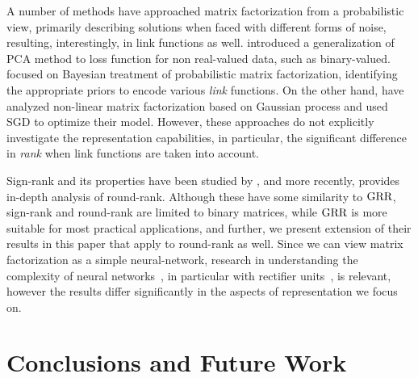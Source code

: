\documentclass{article}
\begin{document}
A number of methods have approached matrix factorization from a probabilistic view, primarily describing solutions when faced with different forms of noise, resulting, interestingly, in link functions as well.
\citet{collins01:a-generalization} introduced a generalization of PCA method to loss function for non real-valued data,
such as binary-valued.
\citet{salakhutdinov08:bayesian} focused on Bayesian treatment of probabilistic matrix factorization, identifying the appropriate priors to encode various \emph{link} functions. %
On the other hand, \citet{lawrence09:non-linear} have analyzed non-linear matrix factorization based on Gaussian process and used SGD to optimize their model. 
However, these approaches do not explicitly investigate the representation capabilities, in particular, the significant difference in \emph{rank} when link functions are taken into account.

Sign-rank and its properties have been studied by \citet{nickel14:reducing,bouchard15:on-approximate,davenport14:1-bit}, and more recently, \citet{neumann2015some} provides in-depth analysis of round-rank. 
Although these have some similarity to $\text{GRR}$, sign-rank and round-rank are limited to binary matrices, while $\text{GRR}$ is more suitable for most practical applications, and further, we present extension of their results in this paper that apply to round-rank as well. 
Since we can view matrix factorization as a simple neural-network, research in understanding the complexity of neural networks~\citep{huang03:learning}, in particular with rectifier units~\citep{pan2016expressiveness}, is relevant, however the results differ significantly in the aspects of representation we focus on.
\section{Conclusions and Future Work}
\label{sec:conclusions}
\end{document}
